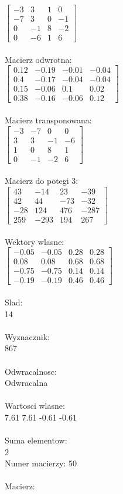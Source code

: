 \documentclass[a4paper,12pt]{article}
\begin{document}
$\begin{bmatrix} -3&3&1&0\\-7&3&0&-1\\0&-1&8&-2\\0&-6&1&6 \end{bmatrix}$
\\
\\
Macierz odwrotna:\\

$\begin{bmatrix} 0.12&-0.19&-0.01&-0.04\\0.4&-0.17&-0.04&-0.04\\0.15&-0.06&0.1&0.02\\0.38&-0.16&-0.06&0.12 \end{bmatrix}$
\\
\\
Macierz transponowana:\\

$\begin{bmatrix} -3&-7&0&0\\3&3&-1&-6\\1&0&8&1\\0&-1&-2&6 \end{bmatrix}$
\\
\\
Macierz do potegi 3:\\

$\begin{bmatrix} 43&-14&23&-39\\42&44&-73&-32\\-28&124&476&-287\\259&-293&194&267 \end{bmatrix}$
\\
\\
Wektory wlasne:\\

$\begin{bmatrix} -0.05&-0.05&0.28&0.28\\0.08&0.08&0.68&0.68\\-0.75&-0.75&0.14&0.14\\-0.19&-0.19&0.46&0.46 \end{bmatrix}$
\\
\\
Slad:\\
14
\\
\\
Wyznacznik:\\
867
\\
\\
Odwracalnosc:\\
Odwracalna
\\
\\
Wartosci wlasne:\\
7.61 7.61 -0.61 -0.61
\\
\\
Suma elementow:\\
2
\\
\newpage
Numer macierzy:
50
\\
\\
Macierz:\\
\end{document}
